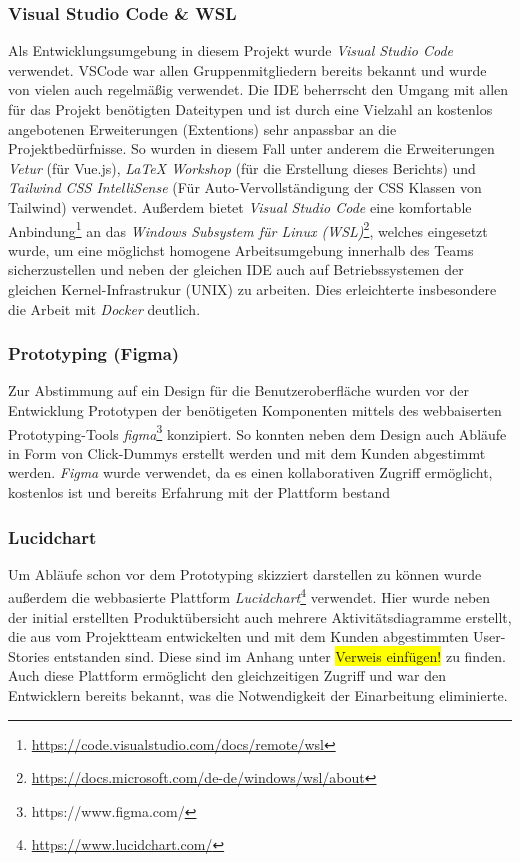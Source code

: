 \documentclass[10pt, a4paper]{article}
\begin{document}
\subsubsection{Visual Studio Code \& WSL}
Als Entwicklungsumgebung in diesem Projekt wurde \textit{Visual Studio Code} verwendet. VSCode war allen Gruppenmitgliedern bereits bekannt und wurde von vielen auch regelmäßig verwendet.
Die IDE beherrscht den Umgang mit allen für das Projekt benötigten Dateitypen und ist durch eine Vielzahl an kostenlos angebotenen Erweiterungen (Extentions) sehr anpassbar an die Projektbedürfnisse.
So wurden in diesem Fall unter anderem die Erweiterungen \textit{Vetur} (für Vue.js), \textit{LaTeX Workshop}  (für die Erstellung dieses Berichts) und \textit{Tailwind CSS IntelliSense} (Für Auto-Vervollständigung der CSS Klassen von Tailwind) verwendet.
Außerdem bietet \textit{Visual Studio Code} eine komfortable Anbindung\footnote{\raggedright\url{https://code.visualstudio.com/docs/remote/wsl}} an das
\textit{Windows Subsystem für Linux (WSL)}\footnote{\raggedright\url{https://docs.microsoft.com/de-de/windows/wsl/about}}, welches eingesetzt wurde, um eine möglichst homogene Arbeitsumgebung innerhalb des Teams sicherzustellen
und neben der gleichen IDE auch auf Betriebssystemen der gleichen Kernel-Infrastrukur (UNIX) zu arbeiten. Dies erleichterte insbesondere die Arbeit mit \textit{Docker} deutlich.

\subsubsection{Prototyping (Figma)}
Zur Abstimmung auf ein Design für die Benutzeroberfläche wurden vor der Entwicklung Prototypen der benötigeten Komponenten mittels des webbaiserten
Prototyping-Tools \textit{figma}\footnote{https://www.figma.com/} konzipiert. So konnten neben dem Design auch Abläufe in Form von \glqq Click-Dummys\grqq{} erstellt werden und mit dem Kunden abgestimmt werden.
\textit{Figma} wurde verwendet, da es einen kollaborativen Zugriff ermöglicht, kostenlos ist und bereits Erfahrung mit der Plattform bestand

\subsubsection{Lucidchart}
Um Abläufe schon vor dem Prototyping skizziert darstellen zu können wurde außerdem die webbasierte Plattform \textit{Lucidchart}\footnote{\raggedright\url{https://www.lucidchart.com/}} verwendet.
Hier wurde neben der initial erstellten Produktübersicht auch mehrere Aktivitätsdiagramme erstellt, die aus vom Projektteam entwickelten und mit dem Kunden abgestimmten User-Stories entstanden sind.
Diese sind im Anhang unter \colorbox{yellow}{Verweis einfügen!} zu finden.
Auch diese Plattform ermöglicht den gleichzeitigen Zugriff und war den Entwicklern bereits bekannt, was die Notwendigkeit der Einarbeitung eliminierte.
\end{document}
